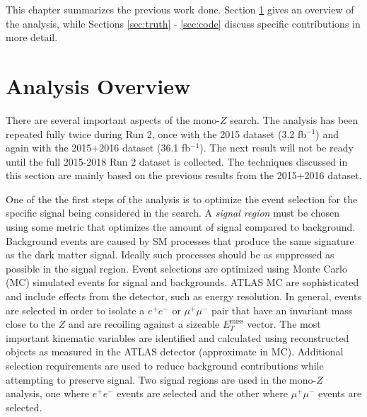 \label{chapter:prevWork}

This chapter summarizes the previous work done. Section \ref{sec:analysis} gives an overview of the analysis, while Sections \ref{sec:truth} - \ref{sec:code} discuss specific contributions in more detail.

\section{Analysis Overview}
\label{sec:analysis}

There are several important aspects of the mono-$Z$ search. The analysis has been repeated fully twice during Run 2, once with the 2015 dataset (3.2 fb$^{-1}$) and again with the 2015+2016 dataset (36.1 fb$^{-1}$). The next result will not be ready until the full 2015-2018 Run 2 dataset is collected. The techniques discussed in this section are mainly based on the previous results from the 2015+2016 dataset. 

One of the the first steps of the analysis is to optimize the event selection for the specific signal being considered in the search. A \textit{signal region} must be chosen using some metric that optimizes the amount of signal compared to background. Background events are caused by SM processes that produce the same signature as the dark matter signal. Ideally such processes should be as suppressed as possible in the signal region. Event selections are optimized using Monte Carlo (MC) simulated events for signal and backgrounds. ATLAS MC are sophisticated and include effects from the detector, such as energy resolution. In general, events are selected in order to isolate a $e^+e^-$ or $\mu^+\mu^-$ pair that have an invariant mass close to the $Z$ and are recoiling against a sizeable $E_{T}^{\text{miss}}$ vector. The most important kinematic variables are identified and calculated using reconstructed objects as measured in the ATLAS detector (approximate in MC). Additional selection requirements are used to reduce background contributions while attempting to preserve signal. Two signal regions are used in the mono-$Z$ analysis, one where $e^+e^-$ events are selected and the other where $\mu^+\mu^-$ events are selected.

